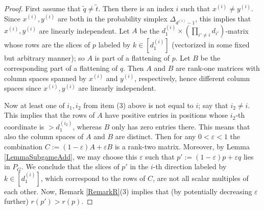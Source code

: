 \documentclass[10pt,a4paper]{amsart}
\renewcommand{\tilde}[1]{\widetilde{#1}}
\begin{document}
\begin{proof}
First assume that $\tilde{q} \neq \tilde{t}$. Then there is an index $i$
such that $x^{(i)} \neq y^{(i)}$. Since $x^{(i)},y^{(i)}$ are both in the
probability simplex $\Delta_{d^{(i)}-1}$, this implies that
$x^{(i)},y^{(i)}$ are linearly independent. Let
$A$ be the $d^{(i)}_1 \times \left(\prod_{i' \neq i} d_{i'}\right)$-matrix whose
rows are the slices of $p$ labeled by $k \in [d^{(i)}_1]$ (vectorized in
some fixed but arbitrary manner); so $A$ is part of a
flattening of $p$. Let $B$ be the corresponding part of a flattening
of $q$. Then $A$ and $B$ are rank-one matrices with column spaces spanned
by $x^{(i)}$ and $y^{(i)}$, respectively, hence different column
spaces since $x^{(i)},y^{(i)}$ are linearly independent.

Now at least one of $i_1,i_2$ from item (3) above is not equal to $i$;
say that $i_2 \neq i$. This implies that the rows of $A$ have positive
entries in positions whose $i_2$-th coordinate is $>d^{(i_2)}_1$,
whereas $B$ only has zero entries there. This means that also the column
spaces of $A$ and $B$ are distinct.  Then for any $0 < \varepsilon <1$
the combination $C:=(1-\varepsilon)A + \varepsilon B$ is a rank-two matrix. 
Moreover, by Lemma \ref{LemmaSubgameAdd}, we may choose this
$\varepsilon$ such that $p':=(1-\varepsilon)p+\varepsilon q$ lies in $P_G$.
We conclude that the slices of $p'$ in the $i$-th direction labeled by
$k \in [d^{(i)}_1]$, which correspond to the rows of $C$, are not all
scalar multiples of each other. Now, Remark \ref{RemarkR}(3) implies that (by potentially decreasing $\varepsilon$ further) $r(p')>r(p)$. 


\end{proof}
\end{document}
